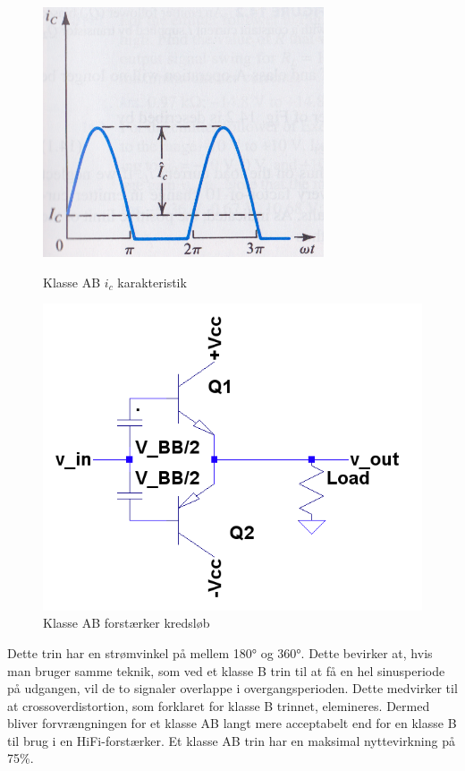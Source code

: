 \begin{figure}[ht]
\begin{minipage}[b]{0.5\linewidth}
\centering
\includegraphics[scale=.35]{indledende_analyse/klasser/klasseab.png}
\caption{Klasse AB $i_c$ karakteristik}
\label{fig:klasseab}
\end{minipage}
\hspace{0.5cm}
\begin{minipage}[b]{0.5\linewidth}
\centering
\includegraphics[scale=.35]{indledende_analyse/klasser/classab.png}
\caption{Klasse AB forstærker kredsløb}
\label{fig:classab}
\end{minipage}
\end{figure}


Dette trin har en strømvinkel på mellem 180° og 360°. Dette bevirker at, hvis man bruger samme teknik, som ved et klasse B trin til at få en hel sinusperiode på udgangen, vil de to signaler overlappe i overgangsperioden. Dette medvirker til at crossoverdistortion, som forklaret for klasse B trinnet, elemineres. Dermed bliver forvrængningen for et klasse AB langt mere acceptabelt end for en klasse B til brug i en HiFi-forstærker.
Et klasse AB trin har en maksimal nyttevirkning på 75\%.

